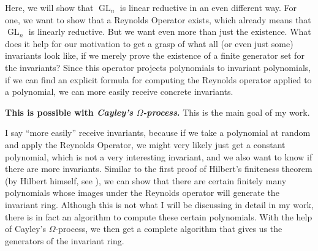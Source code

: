 Here, we will show that $\operatorname{GL}_n$ is linear reductive in an even different way.
For one, we want to show that a Reynolds Operator exists, which already means that $\operatorname{GL}_n$ is linearly reductive.
But we want even more than just the existence.
What does it help for our motivation to get a grasp of what all (or even just some) invariants look like, if we merely prove the existence of a finite generator set for the invariants?
Since this operator projects polynomials to invariant polynomials, if we can find an explicit formula for computing the Reynolds operator applied to a polynomial, we can more easily receive concrete invariants.

\textbf{This is possible with \textit{Cayley's $\Omega$-process}.}
This is the main goal of my work.

I say ``more easily'' receive invariants, because if we take a polynomial at random and apply the Reynolds Operator, we might very likely just get a constant polynomial, which is not a very interesting invariant, and we also want to know if there are more invariants.
Similar to the first proof of Hilbert's finiteness theorem (by Hilbert himself, see \cite[p.41,42]{DK15}), we can show that there are certain finitely many polynomials whose images under the Reynolds operator will generate the invariant ring.
Although this is not what I will be discussing in detail in my work, there is in fact an algorithm to compute these certain polynomials.
With the help of Cayley's $\Omega$-process, we then get a complete algorithm that gives us the generators of the invariant ring.

